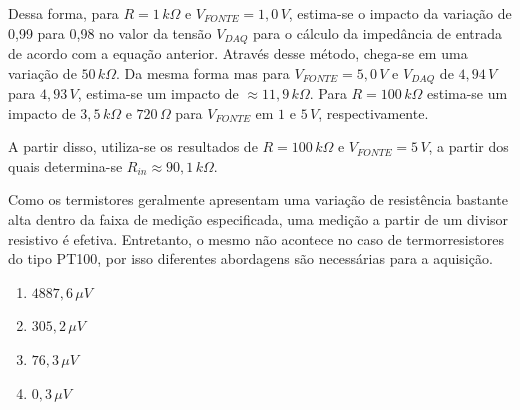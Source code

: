 \documentclass[a4paper]{report}
\begin{document}
Dessa forma, para $R=1\,k\Omega$ e $V_{FONTE} = 1,0\,V$, estima-se o impacto da variação de 0,99 para 0,98 no valor da tensão $V_{DAQ}$ para o cálculo da impedância de entrada de acordo com a equação anterior. Através desse método, chega-se em uma variação de $50\,k\Omega$. Da mesma forma mas para $V_{FONTE} = 5,0\,V$ e $V_{DAQ}$ de $4,94\,V$ para $4,93\,V$, estima-se um impacto de $\approx 11,9\,k\Omega$. Para $R=100\,k\Omega$ estima-se um impacto de $3,5\,k\Omega$ e $720\,\Omega$ para $V_{FONTE}$ em $1$ e $5\,V$, respectivamente.

A partir disso, utiliza-se os resultados de $R=100\,k\Omega$ e $V_{FONTE}=5\,V$, a partir dos quais determina-se $R_{in} \approx 90,1\,k\Omega$.


Como os termistores geralmente apresentam uma variação de resistência bastante alta dentro da faixa de medição especificada, uma medição a partir de um divisor resistivo é efetiva. Entretanto, o mesmo não acontece no caso de termorresistores do tipo PT100, por isso diferentes abordagens são necessárias para a aquisição.


\begin{enumerate}[label=\alph*]
    \item $4887,6\,\mu V$
    \item $305,2\,\mu V$
    \item $76,3\,\mu V$
    \item $0,3\,\mu V$
\end{enumerate}
\end{document}
